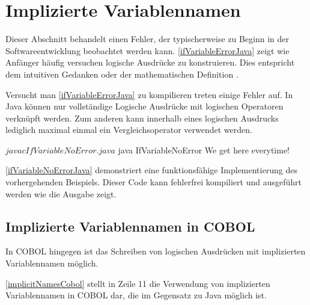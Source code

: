 \section{Implizierte Variablennamen}

Dieser Abschnitt behandelt einen Fehler, der typischerweise zu Beginn in der Softwareentwicklung beobachtet werden kann. \autoref{ifVariableErrorJava} zeigt wie Anfänger häufig versuchen logische Ausdrücke zu konstruieren. Dies entspricht dem intuitiven Gedanken  oder der mathematischen Definition .\\

\sepCodeAndOutput
{}
\begin{shellwindow}
$ javac -Xmaxerrs 3 IfVariableError.java 
IfVariableError.java:4: error: > expected
        if (System.currentTimeMillis() > 0 && < Long.MAX_VALUE) {
                                                              ^
IfVariableError.java:4: error: ')' expected
        if (System.currentTimeMillis() > 0 && < Long.MAX_VALUE) {
                                                               ^
IfVariableError.java:8: error: illegal start of type
        if (0 < System.currentTimeMillis() < Long.MAX_VALUE) {
        ^
3 errors
\end{shellwindow}

Versucht man \autoref{ifVariableErrorJava} zu kompilieren treten einige Fehler auf. In Java können nur vollständige Logische Ausdrücke mit logischen Operatoren verknüpft werden. Zum anderen kann innerhalb eines logischen Ausdrucks lediglich maximal einmal ein Vergleichsoperator verwendet werden. \\

\sepCodeAndOutput
{}
\begin{shellwindow}
$ javac IfVariableNoError.java 
$ java IfVariableNoError
We get here everytime!
\end{shellwindow}

\autoref{ifVariableNoErrorJava} demonstriert eine funktionsfähige Implementierung des vorhergehenden Beispiels. Dieser Code kann fehlerfrei kompiliert und ausgeführt werden wie die Ausgabe zeigt.\\

\subsection*{Implizierte Variablennamen in COBOL}

In COBOL hingegen ist das Schreiben von logischen Ausdrücken mit implizierten Variablennamen möglich.\\


\autoref{implicitNamesCobol} stellt in Zeile 11 die Verwendung von implizierten Variablennamen in COBOL dar, die im Gegensatz zu Java möglich ist.